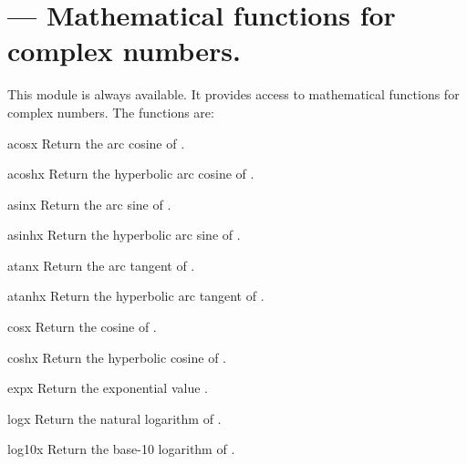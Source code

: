 \section{ ---
         Mathematical functions for complex numbers.}



This module is always available.
It provides access to mathematical functions for complex numbers.
The functions are:

\begin{funcdesc}{acos}{x}
Return the arc cosine of .
\end{funcdesc}

\begin{funcdesc}{acosh}{x}
Return the hyperbolic arc cosine of .
\end{funcdesc}

\begin{funcdesc}{asin}{x}
Return the arc sine of .
\end{funcdesc}

\begin{funcdesc}{asinh}{x}
Return the hyperbolic arc sine of .
\end{funcdesc}

\begin{funcdesc}{atan}{x}
Return the arc tangent of .
\end{funcdesc}

\begin{funcdesc}{atanh}{x}
Return the hyperbolic arc tangent of .
\end{funcdesc}

\begin{funcdesc}{cos}{x}
Return the cosine of .
\end{funcdesc}

\begin{funcdesc}{cosh}{x}
Return the hyperbolic cosine of .
\end{funcdesc}

\begin{funcdesc}{exp}{x}
Return the exponential value .
\end{funcdesc}

\begin{funcdesc}{log}{x}
Return the natural logarithm of .
\end{funcdesc}

\begin{funcdesc}{log10}{x}
Return the base-10 logarithm of .
\end{funcdesc}

